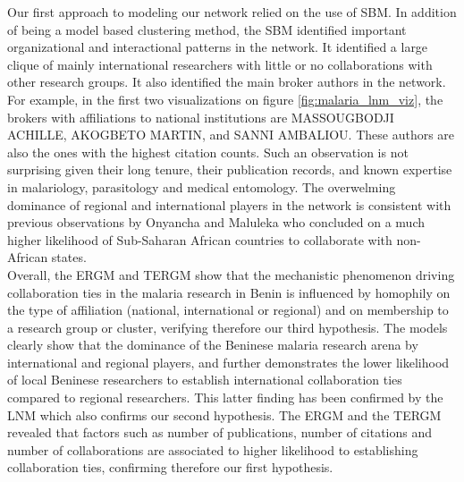 Our first approach to modeling our network relied on the use of SBM. In addition of being a model based clustering method, the SBM identified important organizational and interactional patterns in the network. It identified a large clique of mainly international researchers with little or no collaborations with other research groups.
It also identified the main broker authors in the network. For example, in the first two visualizations on figure \ref{fig:malaria_lnm_viz}, the brokers with affiliations to national institutions are MASSOUGBODJI ACHILLE, AKOGBETO MARTIN, and SANNI AMBALIOU. These authors are also the ones with the highest citation counts. Such an observation is not surprising given their long tenure, their publication records, and known expertise in malariology, parasitology and medical entomology. 
The overwelming dominance of regional and international players in the network is consistent with previous observations by Onyancha and Maluleka \cite{onyancha_knowledge_2011} who concluded on a much higher likelihood of Sub-Saharan African countries to collaborate with non-African states. \\
Overall, the ERGM and TERGM show that the mechanistic phenomenon driving collaboration ties in the malaria research in Benin is influenced by homophily on the type of affiliation (national, international or regional) and on membership to a research group or cluster, verifying therefore our third hypothesis. The models clearly show that the dominance of the Beninese malaria research arena by international and regional players, and further demonstrates the lower likelihood of local Beninese researchers to establish international collaboration ties compared to regional researchers. This latter finding has been confirmed by the LNM which also confirms our second hypothesis. The ERGM and the TERGM revealed that factors such as number of publications, number of citations and number of collaborations are associated to higher likelihood to establishing collaboration ties, confirming therefore our first hypothesis. \\
